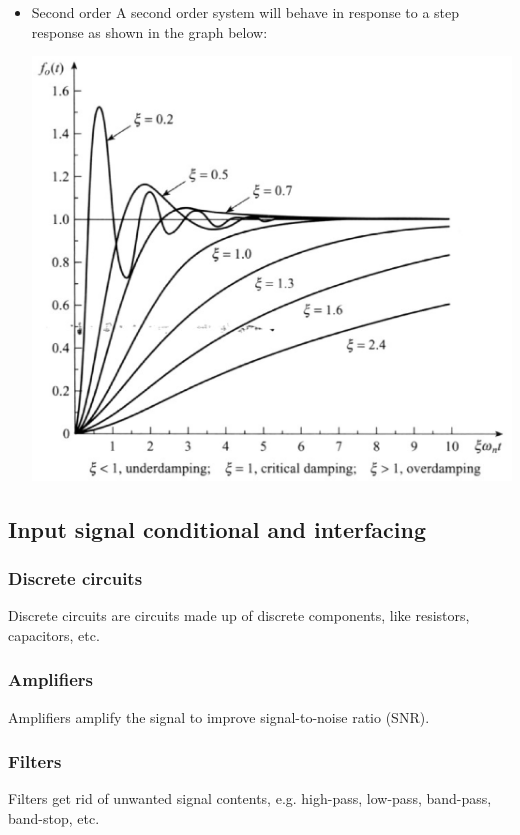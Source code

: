 \documentclass[11pt]{article}
\begin{document}
 \newpage

\begin{itemize}
\item Second order
A second order system will behave in response to a step response as shown in the graph below:
\begin{center}
\includegraphics[width=.9\linewidth]{./images/second-order-system-response.png}
\end{center}
\end{itemize}

 \newpage

\subsection{Input signal conditional and interfacing}
\label{sec:orgd4fc2f3}

\subsubsection{Discrete circuits}
\label{sec:orgb7b02d3}
Discrete circuits are circuits made up of discrete components, like resistors, capacitors, etc.

\subsubsection{Amplifiers}
\label{sec:orgc680c9b}
Amplifiers amplify the signal to improve signal-to-noise ratio (SNR).

\subsubsection{Filters}
\label{sec:orgf2fa8e7}
Filters get rid of unwanted signal contents, e.g. high-pass, low-pass, band-pass, band-stop, etc.
\end{document}
